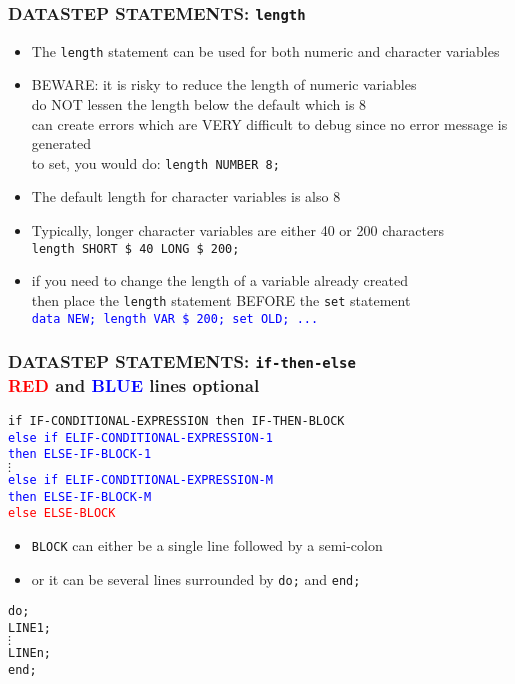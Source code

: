 \documentclass[11pt,pdftex,dvipsnames,usenames,helvetica]{beamer}
\begin{document}
\begin{frame}[fragile]
\frametitle{DATASTEP STATEMENTS: {\tt length}}
\begin{itemize}
\item The {\tt length} statement can be used for both numeric and
  character variables\\

\item BEWARE: it is risky to reduce the length of numeric variables\\
do NOT lessen the length below the default which is 8\\
can create errors which are VERY difficult to debug
since no error message is generated\\
to set, you would do: {\tt length NUMBER 8;}
\item The default length for character variables is also 8
\item Typically, longer character variables are either 40 or 200 characters\\
  {\tt length SHORT \$ 40 LONG \$ 200;}
\item if you need to change the length of a variable already created\\
then place the {\tt length} statement BEFORE the {\tt set} statement\\
\textcolor{blue}{\tt data NEW; length VAR \$ 200; set OLD; ...}\\
\end{itemize}
\end{frame}

\begin{frame}
\frametitle{DATASTEP STATEMENTS: {\tt if-then-else}\\ 
\textcolor{red}{RED} and 
\textcolor{blue}{BLUE} lines optional}
{\tt if IF-CONDITIONAL-EXPRESSION then IF-THEN-BLOCK \\
\textcolor{blue}{else if ELIF-CONDITIONAL-EXPRESSION-1\\
then ELSE-IF-BLOCK-1} \\
$\vdots$ \\
\textcolor{blue}{else if ELIF-CONDITIONAL-EXPRESSION-M\\
then ELSE-IF-BLOCK-M} \\
\textcolor{red}{else ELSE-BLOCK}}
\begin{itemize}
\item {\tt BLOCK} can either be a single line followed by a semi-colon
\item or it can be several lines surrounded by {\tt do;} and {\tt end;}\\
\end{itemize}
{\tt do;\\ \qquad LINE1;\\ \qquad $\vdots$\\ \qquad LINEn;\\ end;}
\end{frame}
\end{document}
